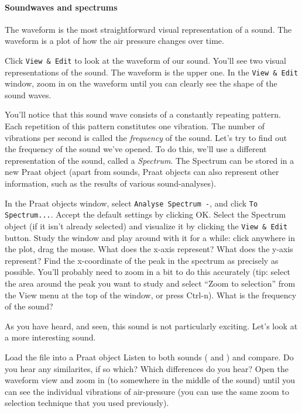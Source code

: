 \documentclass[a4paper, 9pt]{article}
\begin{document}
\paragraph{Soundwaves and spectrums}\label{soundwaves-and-spectrums}

The waveform is the most straightforward visual representation of a
sound. The waveform is a plot of how the air pressure changes over time.

\begin{exercise}
\action Click \texttt{View \& Edit} to look at the waveform of our sound.
You'll see two visual representations of the sound. The waveform is the
upper one.
\action In the \texttt{View \& Edit} window, zoom in on the waveform until you can clearly see the shape of the sound waves.
\end{exercise}

You'll notice that this sound wave consists of a constantly repeating
pattern. Each repetition of this pattern constitutes one vibration. The
number of vibrations per second is called the \emph{frequency} of the
sound.
Let's try to find out the frequency of the sound we've opened. To do
this, we'll use a different representation of the sound, called a
\emph{Spectrum}. The Spectrum can be stored in a new Praat object (apart
from sounds, Praat objects can also represent other information, such as
the results of various sound-analyses).

\begin{exercise}
\action In the Praat objects window, select \texttt{Analyse Spectrum -}, and click \texttt{To Spectrum...}. Accept the default settings by clicking OK.
\action Select the Spectrum object (if it isn't already selected) and visualize it by clicking the \texttt{View \& Edit} button.
\action Study the window and play around with it for a while: click anywhere in the plot, drag the mouse. What does the x-axis represent? What does the y-axis represent?
\action Find the x-coordinate of the peak in the spectrum as precisely as possible. You'll probably need to zoom in a bit to do this accurately (tip: select the area around the peak you want to study and select ``Zoom to selection'' from the View menu at the top of the window, or press Ctrl-n). What is the frequency of the sound? 
\end{exercise}

As you have heard, and seen, this sound is not particularly exciting.
Let's look at a more interesting sound.

\begin{exercise}
\action Load the file  into a Praat object 
\action Listen to both sounds ( and ) and compare. Do you hear any similarites, if so which? Which differences do you hear?
\action Open the waveform view and zoom in (to somewhere in the middle of the sound) until you can see the individual vibrations of air-pressure (you can use the same zoom to selection technique that you used previously).
\end{exercise}
\end{document}
